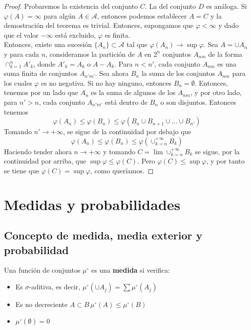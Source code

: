 \begin{proof}
Probaremos la existencia del conjunto $C$. La del conjunto $D$ es análoga. Si $\varphi(A) = \infty$ para algún $A \in \mathcal{A}$, entonces podemos establecer $A = C$ y la demostración del teorema es trivial. Entonces, supongamos que $\varphi < \infty$ y dado que el valor $-\infty$ está excluido, $\varphi$ es finita.\\

Entonces, existe una sucesión $\{A_n\} \subset \mathcal{A}$ tal que $\varphi(A_n) \to \sup \varphi$. Sea $A = \cup A_n $ y para cada $n$, consideramos la partición de $A$ en $2^n$ conjuntos $A_{nm}$ de la forma $\displaystyle \cap_{k=1}^n A'_k$, donde $A'_k = A_k$ o $A - A_k$. Para $n < n'$, cada conjunto $A_{nm}$ es una suma finita de conjuntos $A_{n'm'}$. Sea ahora $B_n$ la suma de los conjuntos $A_{nm}$ para los cuales $\varphi$ es no negativa. Si no hay ninguno, entonces $B_n = \emptyset$. Entonces, tenemos por un lado que $A_n$ es la suma de algunos de los $A_{nm}$, y por otro lado, para $n' > n$, cada conjunto $A_{n'm'}$ está dentro de $B_n$ o son disjuntos. Entonces tenemos
$$ \varphi(A_n) \leq \varphi(B_n) \leq \varphi (B_n \cup B_{n+1} \cup ... \cup B_{n'}) $$
Tomando $n' \to +\infty$, se sigue de la continuidad por debajo que
$$ \varphi(A_n) \leq \varphi (B_n) \leq \varphi \left( \cup_{k=n}^{+\infty} B_k\right) $$
Haciendo tender ahora $n \to +\infty$ y tomando $\displaystyle C = \lim \cup_{k = n}^{+\infty} B_k$ se sigue, por la continuidad por arriba, que $\sup \varphi \leq \varphi(C)$. Pero $\varphi(C) \leq \sup \varphi$, y por tanto se tiene que $\varphi(C) = \sup \varphi$, como queríamos.

\end{proof}

\section{Medidas y probabilidades}

\subsection{Concepto de medida, media exterior y probabilidad}
Una función de conjuntos $\mu^\circ$ es una \textbf{medida} si verifica:
\begin{itemize}
\item Es $\sigma$-aditiva, es decir,  $\mu^\circ (\cup A_j) = \displaystyle \sum \mu^\circ (A_j)$
\item Es no decreciente $A\subset B \, \mu^\circ(A)\leq \mu^\circ(B)$
\item $\mu^\circ(\emptyset)=0$
\end{itemize}

